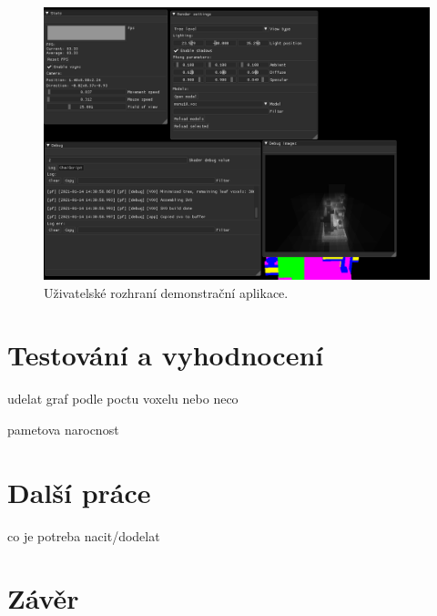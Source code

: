 \begin{figure}[H]
	\centering
	\includegraphics[scale=1]{obrazky-figures/svo_ui.png}
	\caption{Uživatelské rozhraní demonstrační aplikace.}
	\label{fig:svo_ui}
\end{figure}


\chapter{Testování a vyhodnocení}
\label{testovani}
udelat graf podle poctu voxelu nebo neco

pametova narocnost

\chapter{Další práce}
\label{dalsi_prace}
co je potreba nacit/dodelat


\chapter{Závěr}
\label{zaver}




